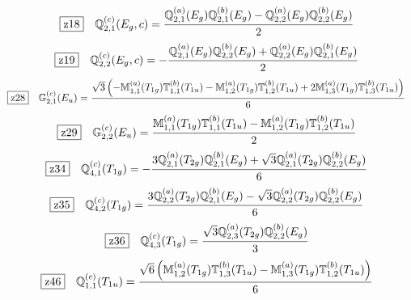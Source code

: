 \documentclass[fleqn,10pt,landscape]{jsarticle}
\begin{document}
\begin{dmath*}
\hspace*{3mm}\fbox{z18}\quad \mathbb{Q}_{2,1}^{(c)}(E_{g},c)=\frac{\mathbb{Q}_{2,1}^{(a)}(E_{g}) \mathbb{Q}_{2,1}^{(b)}(E_{g}) - \mathbb{Q}_{2,2}^{(a)}(E_{g}) \mathbb{Q}_{2,2}^{(b)}(E_{g})}{2}
\end{dmath*}
\begin{dmath*}
\hspace*{3mm}\fbox{z19}\quad \mathbb{Q}_{2,2}^{(c)}(E_{g},c)=- \frac{\mathbb{Q}_{2,1}^{(a)}(E_{g}) \mathbb{Q}_{2,2}^{(b)}(E_{g}) + \mathbb{Q}_{2,2}^{(a)}(E_{g}) \mathbb{Q}_{2,1}^{(b)}(E_{g})}{2}
\end{dmath*}
\begin{dmath*}
\hspace*{3mm}\fbox{z28}\quad \mathbb{G}_{2,1}^{(c)}(E_{u})=\frac{\sqrt{3} \left(- \mathbb{M}_{1,1}^{(a)}(T_{1g}) \mathbb{T}_{1,1}^{(b)}(T_{1u}) - \mathbb{M}_{1,2}^{(a)}(T_{1g}) \mathbb{T}_{1,2}^{(b)}(T_{1u}) + 2 \mathbb{M}_{1,3}^{(a)}(T_{1g}) \mathbb{T}_{1,3}^{(b)}(T_{1u})\right)}{6}
\end{dmath*}
\begin{dmath*}
\hspace*{3mm}\fbox{z29}\quad \mathbb{G}_{2,2}^{(c)}(E_{u})=\frac{\mathbb{M}_{1,1}^{(a)}(T_{1g}) \mathbb{T}_{1,1}^{(b)}(T_{1u}) - \mathbb{M}_{1,2}^{(a)}(T_{1g}) \mathbb{T}_{1,2}^{(b)}(T_{1u})}{2}
\end{dmath*}
\begin{dmath*}
\hspace*{3mm}\fbox{z34}\quad \mathbb{Q}_{4,1}^{(c)}(T_{1g})=- \frac{3 \mathbb{Q}_{2,1}^{(a)}(T_{2g}) \mathbb{Q}_{2,1}^{(b)}(E_{g}) + \sqrt{3} \mathbb{Q}_{2,1}^{(a)}(T_{2g}) \mathbb{Q}_{2,2}^{(b)}(E_{g})}{6}
\end{dmath*}
\begin{dmath*}
\hspace*{3mm}\fbox{z35}\quad \mathbb{Q}_{4,2}^{(c)}(T_{1g})=\frac{3 \mathbb{Q}_{2,2}^{(a)}(T_{2g}) \mathbb{Q}_{2,1}^{(b)}(E_{g}) - \sqrt{3} \mathbb{Q}_{2,2}^{(a)}(T_{2g}) \mathbb{Q}_{2,2}^{(b)}(E_{g})}{6}
\end{dmath*}
\begin{dmath*}
\hspace*{3mm}\fbox{z36}\quad \mathbb{Q}_{4,3}^{(c)}(T_{1g})=\frac{\sqrt{3} \mathbb{Q}_{2,3}^{(a)}(T_{2g}) \mathbb{Q}_{2,2}^{(b)}(E_{g})}{3}
\end{dmath*}
\begin{dmath*}
\hspace*{3mm}\fbox{z46}\quad \mathbb{Q}_{1,1}^{(c)}(T_{1u})=\frac{\sqrt{6} \left(\mathbb{M}_{1,2}^{(a)}(T_{1g}) \mathbb{T}_{1,3}^{(b)}(T_{1u}) - \mathbb{M}_{1,3}^{(a)}(T_{1g}) \mathbb{T}_{1,2}^{(b)}(T_{1u})\right)}{6}
\end{dmath*}
\end{document}
